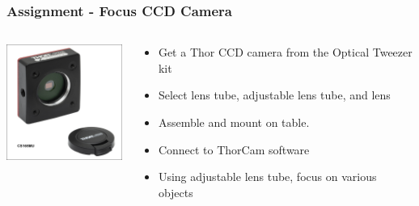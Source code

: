 \documentclass{beamer}
\begin{document}
\begin{frame}\frametitle{Assignment - Focus CCD Camera}
\begin{columns}
\begin{column}{4.5cm}
\begin{center}
\includegraphics[width=4cm]{fig/thorCCD.jpg}
\end{center}
\end{column}
\begin{column}{7cm}
\begin{itemize}
\item Get a Thor CCD camera from the Optical Tweezer kit
\item Select lens tube, adjustable lens tube, and lens
\item Assemble and mount on table. 
\item Connect to ThorCam software
\item Using adjustable lens tube, focus on various objects
\end{itemize}
\end{column}
\end{columns}
\end{frame}
\end{document}
